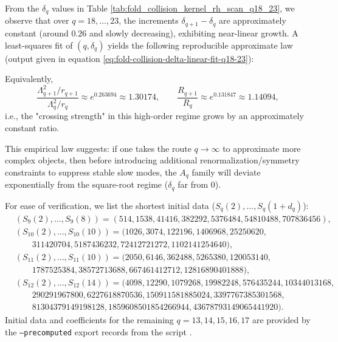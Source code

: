 \begin{remark}[Near-linear law for higher-order \texorpdfstring{$\delta_q$}{deltaq} (\(q=18,\dots,23\))]\label{rem:pom-collision-kernel-rh-linear}
From the \(\delta_q\) values in Table \ref{tab:fold_collision_kernel_rh_scan_q18_23}, we observe that over \(q=18,\dots,23\), the increments
\(\delta_{q+1}-\delta_q\) are approximately constant (around \(0.26\) and slowly decreasing), exhibiting near-linear growth.
A least-squares fit of \((q,\delta_q)\) yields the following reproducible approximate law (output given in equation \eqref{eq:fold-collision-delta-linear-fit-q18-23}):

Equivalently,
\[
\frac{\Lambda_{q+1}^2/r_{q+1}}{\Lambda_q^2/r_q}\approx e^{0.263694}\approx 1.30174,
\qquad
\frac{R_{q+1}}{R_q}\approx e^{0.131847}\approx 1.14094,
\]
i.e., the "crossing strength" in this high-order regime grows by an approximately constant ratio.
\par
This empirical law suggests: if one takes the route \(q\to\infty\) to approximate more complex objects, then before introducing additional renormalization/symmetry constraints to suppress stable slow modes, the \(A_q\) family will deviate exponentially from the square-root regime (\(\delta_q\) far from \(0\)).
\end{remark}



\begin{remark}[Shortest initial data for higher-order recurrences (\(q=9,10,11,12\))]\label{rem:pom-moment-init-9-12}
For ease of verification, we list the shortest initial data (\(S_q(2),\dots,S_q(1+d_q)\)):
$$
\begin{aligned}
&(S_9(2),\dots,S_9(8))=(514,1538,41416,382292,5376484,54810488,707836456),\\
&(S_{10}(2),\dots,S_{10}(10))=(1026,3074,122196,1406968,25250620,\\
&\qquad 311420704,5187436232,72412721272,1102141254640),\\
&(S_{11}(2),\dots,S_{11}(10))=(2050,6146,362488,5265380,120053140,\\
&\qquad 1787525384,38572713688,667461412712,12816890401888),\\
&(S_{12}(2),\dots,S_{12}(14))=(4098,12290,1079268,19982248,576435244,10344013168,\\
&\qquad 290291967800,6227618870536,150911581885024,3397767385301568,\\
&\qquad 81304379149198128,1859608501854266944,43678793149065441920).
\end{aligned}
$$
Initial data and coefficients for the remaining \(q=13,14,15,16,17\) are provided by the \texttt{--precomputed} export records from the script .
\end{remark}

